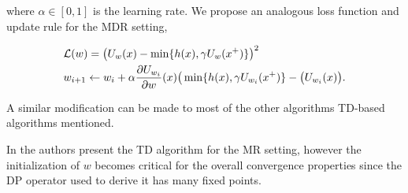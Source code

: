 \noindent where $\alpha \in [0,1]$ is the learning rate. We propose an analogous loss function and update rule for the MDR setting,

\begin{equation}
\begin{split}
&\mathcal{L}(w)=\big(U_{w}(x) - \min\{h(x),\gamma U_{w}(x^+)\}\big)^2\\
&w_{i+1} \leftarrow w_i + \alpha\frac{\partial U_{w_i}}{\partial w}(x)\big(\min\{h(x),\gamma U_{w_i}(x^+)\}- \big(U_{w_i}(x)\big).
\end{split}
\end{equation}

A similar modification can be made to most of the other algorithms TD-based algorithms mentioned. 

In \cite{Akametalu2015} the authors present the TD algorithm for the MR setting, however the initialization of $w$ becomes critical for the overall convergence properties since the DP operator used to derive it has many fixed points.



